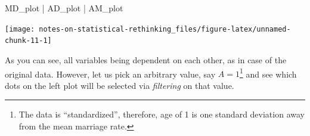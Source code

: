 \documentclass[
]{book}
\newenvironment{Shaded}{\begin{snugshade}}{\end{snugshade}}
\newcommand{\NormalTok}[1]{#1}
\newcommand{\SpecialCharTok}[1]{\textcolor[rgb]{0.00,0.00,0.00}{#1}}
\begin{document}
\begin{Shaded}
\begin{Highlighting}[]
\NormalTok{MD\_plot }\SpecialCharTok{|}\NormalTok{ AD\_plot }\SpecialCharTok{|}\NormalTok{ AM\_plot}
\end{Highlighting}
\end{Shaded}

\begin{center}\texttt{[image: notes-on-statistical-rethinking\_files/figure-latex/unnamed-chunk-11-1]} \end{center}

As you can see, all variables being dependent on each other, as in case of the original data. However, let us pick an arbitrary value, say \(A=1\)\footnote{The data is ``standardized'', therefore, age of 1 is one standard deviation away from the mean marriage rate.} and see which dots on the left plot will be selected via \emph{filtering} on that value.
\end{document}
